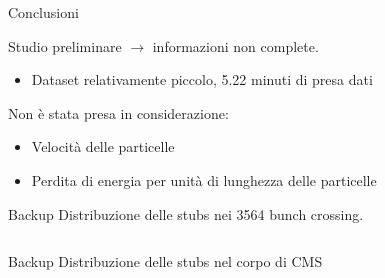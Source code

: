 \documentclass{beamer}
\begin{document}
\begin{frame}{Conclusioni}

Studio preliminare $\rightarrow$ informazioni non complete. 
\begin{itemize}
    \item Dataset relativamente piccolo, 5.22 minuti di presa dati
\end{itemize}

\vspace{0.5cm}
Non è stata presa in considerazione:
\begin{itemize}
    \item Velocità delle particelle
    \item Perdita di energia per unità di lunghezza delle particelle
\end{itemize}



\end{frame}

\begin{frame}{Backup}
   Distribuzione delle stubs nei 3564 bunch crossing.

    \vspace{0.5cm}
\begin{columns}

    \begin{column}{0.5\textwidth}
    \end{column}
    \begin{column}{0.5\textwidth}
        
    \end{column}
\end{columns}
\end{frame}


\begin{frame}{Backup}
   Distribuzione delle stubs nel corpo di CMS

    \vspace{0.5cm}
\begin{columns}

    \begin{column}{0.5\textwidth}
    \end{column}
    \begin{column}{0.5\textwidth}
        
    \end{column}
\end{columns}
\end{frame}
\end{document}
